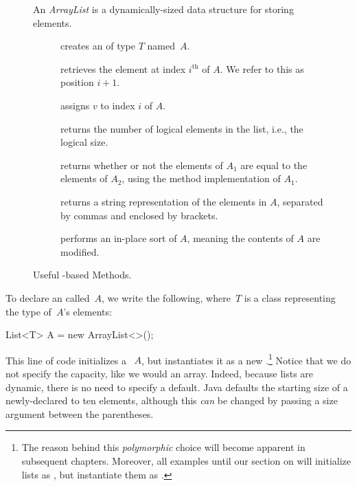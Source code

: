 \begin{figure}[tp]
  \small
  \begin{tcolorbox}[title=Java Array Lists]
    An \emph{ArrayList} is a dynamically-sized data structure for storing elements.
    \vspace{2ex}
  \begin{description}
    \item [] creates an  of type $T$ named~$A$.
    \item [] retrieves the element at index $i^{\text{th}}$ of $A$. We refer to this as position $i + 1$. 
    \item [] assigns $v$ to index $i$ of $A$.
    \item [] returns the number of logical elements in the list, i.e., the logical size.
    \item [] returns whether or not the elements of $A_1$ are equal to the elements of $A_2$, using the  method implementation of $A_1$.
    \item [] returns a string representation of the elements in $A$, separated by commas and enclosed by brackets.
    \item [] performs an in-place sort of $A$, meaning the contents of $A$ are modified.
  \end{description}
\end{tcolorbox}
  \caption{Useful -based Methods.}
  \label{fig:arraylists}
\end{figure}

To declare an  called~$A$, we write the following, where~$T$ is a class representing the type of~$A$'s elements:

\begin{verbnobox}[\small]
List<T> A = new ArrayList<>();
\end{verbnobox}

This line of code initializes a ~$A$, but instantiates it as a new .\footnote{The reason behind this \emph{polymorphic} choice will become apparent in subsequent chapters. Moreover, all examples until our section on  will initialize lists as , but instantiate them as .} 
Notice that we do not specify the capacity, like we would an array. 
Indeed, because lists are dynamic, there is no need to specify a default. 
Java defaults the starting size of a newly-declared  to ten elements, although this \emph{can} be changed by passing a size argument between the parentheses.

